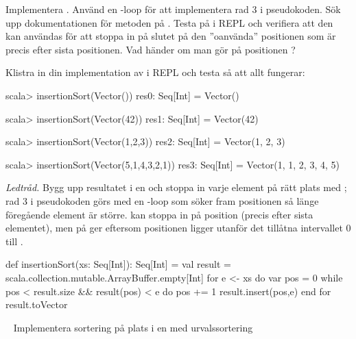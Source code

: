 \Subtask Implementera . Använd en -loop för att implementera rad 3 i pseudokoden. Sök upp dokumentationen för metoden  på . Testa   på  i REPL och verifiera att den kan användas för att stoppa in på slutet på den ''oanvända'' positionen som är precis efter sista positionen. Vad händer om man gör  på positionen ?

Klistra in din implementation av  i REPL och testa så att allt fungerar:
\begin{REPL}
scala> insertionSort(Vector())
res0: Seq[Int] = Vector()

scala> insertionSort(Vector(42))
res1: Seq[Int] = Vector(42)

scala> insertionSort(Vector(1,2,3))
res2: Seq[Int] = Vector(1, 2, 3)

scala> insertionSort(Vector(5,1,4,3,2,1))
res3: Seq[Int] = Vector(1, 1, 2, 3, 4, 5)
\end{REPL}


\SOLUTION

\TaskSolved \what


\SubtaskSolved
\emph{Ledtråd.} Bygg upp resultatet i en  och stoppa in varje element på rätt plats med ; rad 3 i pseudokoden görs med en -loop som söker fram positionen så länge föregående element är större.  kan stoppa in på position  (precis efter sista elementet), men  på  ger  eftersom positionen ligger utanför det tillåtna intervallet 0 till .

\SubtaskSolved

\begin{Code}
def insertionSort(xs: Seq[Int]): Seq[Int] = 
  val result = scala.collection.mutable.ArrayBuffer.empty[Int]
  for e <- xs do
    var pos = 0
    while pos < result.size && result(pos) < e do pos += 1
    result.insert(pos,e)
  end for
  result.toVector
\end{Code}

\QUESTEND






\QUESTBEGIN

\Task  \what~ Implementera sortering på plats  i en  med urvalssortering 

